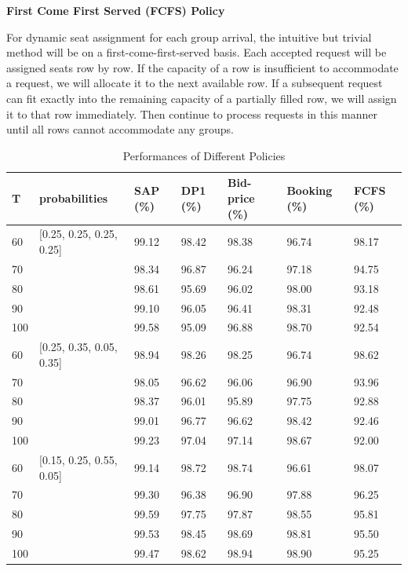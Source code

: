 {\bf{First Come First Served (FCFS) Policy}}

For dynamic seat assignment for each group arrival, the intuitive but trivial method will be on a first-come-first-served basis. Each accepted request will be assigned seats row by row. If the capacity of a row is insufficient to accommodate a request, we will allocate it to the next available row. If a subsequent request can fit exactly into the remaining capacity of a partially filled row, we will assign it to that row immediately. Then continue to process requests in this manner until all rows cannot accommodate any groups.

\begin{table}[ht]
  \centering
  \caption{Performances of Different Policies}
  \begin{tabular}{|l|l|l|l|l|l|l|}
  \hline
   T & probabilities & SAP (\%) & DP1 (\%) & Bid-price (\%) & Booking (\%) & FCFS (\%) \\
  \hline
   60  & [0.25, 0.25, 0.25, 0.25]  & 99.12 & 98.42 & 98.38 & 96.74 & 98.17 \\
   70  &                           & 98.34 & 96.87 & 96.24 & 97.18 & 94.75 \\
   80  &                           & 98.61 & 95.69 & 96.02 & 98.00 & 93.18 \\
   90  &                           & 99.10 & 96.05 & 96.41 & 98.31 & 92.48 \\
   100 &                           & 99.58 & 95.09 & 96.88 & 98.70 & 92.54 \\
   \hline
   60  & [0.25, 0.35, 0.05, 0.35]  & 98.94 & 98.26 & 98.25 & 96.74 & 98.62 \\
   70  &                           & 98.05 & 96.62 & 96.06 & 96.90 & 93.96 \\
   80  &                           & 98.37 & 96.01 & 95.89 & 97.75 & 92.88 \\
   90  &                           & 99.01 & 96.77 & 96.62 & 98.42 & 92.46 \\
   100 &                           & 99.23 & 97.04 & 97.14 & 98.67 & 92.00 \\
  \hline
  60  & [0.15, 0.25, 0.55, 0.05]  & 99.14 & 98.72 & 98.74 & 96.61 & 98.07 \\
  70  &                           & 99.30 & 96.38 & 96.90 & 97.88 & 96.25 \\
  80  &                           & 99.59 & 97.75 & 97.87 & 98.55 & 95.81 \\
  90  &                           & 99.53 & 98.45 & 98.69 & 98.81 & 95.50 \\
  100 &                           & 99.47 & 98.62 & 98.94 & 98.90 & 95.25 \\
  \hline
  \end{tabular}
\end{table}

